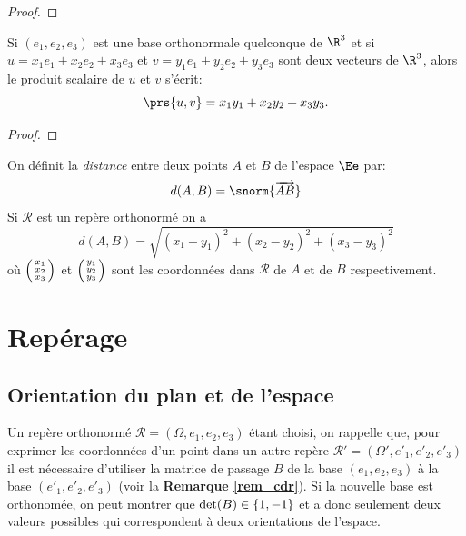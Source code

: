 \begin{proof}
\pl{\rep{4cm}}		
\end{proof}

\sld{\vfill\pagebreak[5]}%

\begin{proposition}
Si $(e_1,e_2,e_3)$ est une base orthonormale quelconque de $\R^3$ et si  $u = x_1 e_1 + x_2 e_2 + x_3 e_3$ et $v = y_1 e_1 + y_2 e_2 + y_3 e_3$ sont deux vecteurs de $\R^3$, alors le produit scalaire de $u$ et $v$ s'écrit:
\[
\prs{u,v} = x_1 y_1 + x_2y_2 + x_3y_3. 
\]
\end{proposition}

\begin{proof}
\pl{\rep{4cm}}		
\end{proof}

\sld{\vfill\pagebreak[5]}%

\begin{definition}
	On définit la \emph{distance} entre deux points $A$ et $B$ de l'espace $\Ee$ par:
	\[
		d(A,B) = \snorm{\overrightarrow{AB}}
	\]
	Si $\mathcal R$ est un repère orthonormé on a 
	\[
		d(A,B) = \sqrt{(x_1-y_1)^2+ (x_2-y_2)^2 + (x_3-y_3)^2 }
	\]
	où $\begin{psmallmatrix}
		x_1\\x_2\\x_3
	\end{psmallmatrix}_{}$ et $\begin{psmallmatrix}
		y_1\\y_2\\y_3
	\end{psmallmatrix}_{}$ sont les coordonnées dans $\mathcal R$ de $A$ et de $B$ respectivement.
\end{definition}

\sld{\vfill\pagebreak[5]}%
\section{Repérage}

\subsection{Orientation du plan et de l'espace}
Un repère orthonorm\'e $\mathcal R = \left(\Omega,e_1,e_2,e_3 \right)$ \'etant choisi, on rappelle que, pour exprimer les coordonn\'ees
d'un point dans un autre rep\`ere $\mathcal R' = \left(\Omega',e'_1,e'_2,e'_3 \right)$ il est n\'ecessaire d'utiliser la matrice de passage $B$
de la base $(e_1,e_2,e_3)$ \`a la base $(e'_1,e'_2,e'_3)$ (voir la {\bf Remarque \ref{rem_cdr}}). Si la nouvelle base est orthonom\'ee, on peut montrer que ${\rm det}(B) \in \{1,-1\}$ et a donc seulement deux valeurs possibles qui correspondent \`a deux orientations de l'espace. 


